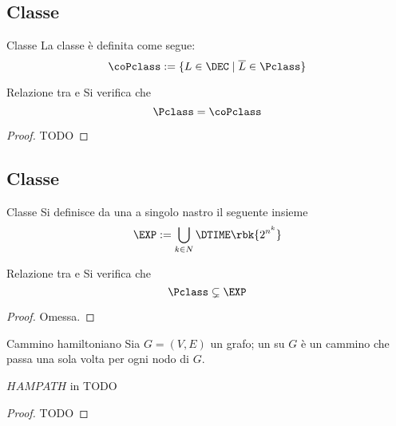 \documentclass[a4paper, 12pt]{report}
\begin{document}
    \subsection{Classe \coPclass}
    
    \begin{frameddefn}{Classe \coPclass}
        La classe \coPclass è definita come segue: $$\coPclass := \{ L \in \DEC \mid \overline L \in \Pclass \}$$
    \end{frameddefn}

    \begin{framedthm}[label={p = cop}]{Relazione tra \Pclass e \coPclass}
        Si verifica che $$\Pclass = \coPclass$$
    \end{framedthm}

    \begin{proof}
        TODO
    \end{proof}

    \subsection{Classe \EXP}

    \begin{frameddefn}{Classe \EXP}
        Si definisce  da una \TM a singolo nastro il seguente insieme $$\EXP := \bigcup_{k \in N}{\DTIME \rbk{2^{n^k}}}$$
    \end{frameddefn}

    \begin{framedprop}[label={p exp}]{Relazione tra \Pclass e \EXP}
        Si verifica che $$\Pclass \subsetneq \EXP$$
    \end{framedprop}

    \begin{proof}
        Omessa.
    \end{proof}

    \begin{frameddefn}{Cammino hamiltoniano}
        Sia $G = (V, E)$ un grafo; un  su $G$ è un cammino che passa una sola volta per ogni nodo di $G$.
    \end{frameddefn}

    \begin{framedthm}{$HAMPATH$ in \EXP}
        TODO
    \end{framedthm}

    \begin{proof}
        TODO
    \end{proof}
\end{document}
